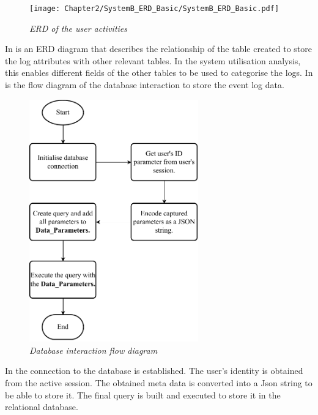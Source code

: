 \begin{figure}[!htb] %
	\centering %
	\texttt{[image: Chapter2/SystemB\_ERD\_Basic/SystemB\_ERD\_Basic.pdf]}
	\caption[ERD of user activities]
	{\textit{ERD of the user activities}}\label{fig:ch2_erdOfEventLogs}
\end{figure}

In  is an ERD diagram that describes the relationship of the table created to store the log attributes with other relevant tables. In the system utilisation analysis, this enables different fields of the other tables to be used to categorise the logs. In  is the flow diagram of the database interaction to store the event log data.

\clearpage

\begin{figure}[!htb]
	\centering
	\includegraphics[width=0.65\textwidth]{img/Chapter2/sql_interaction/sql_interaction.pdf}
	\caption[Database interaction flow diagram]
	{\textit{Database interaction flow diagram}}\label{fig:ch2_database}
\end{figure}

In  the connection to the database is established. The user's identity is obtained from the active session. The obtained meta data is converted into a Json string to be able to store it. The final query is built and executed to store it in the relational database.

